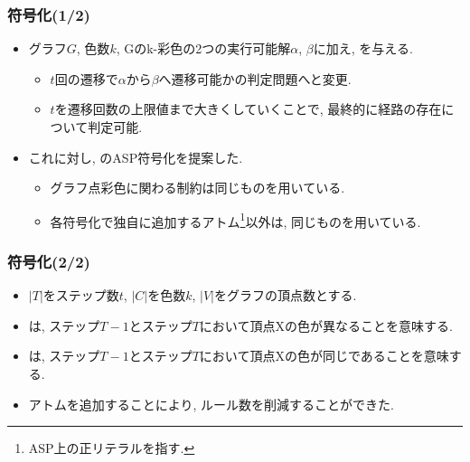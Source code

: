 \documentclass[dvipdfmx,11pt]{beamer}
\begin{document}

\begin{frame}\frametitle{符号化(1/2)}

  \begin{itemize}
    \item グラフ$G$, 色数$k$, Gのk-彩色の2つの実行可能解$\alpha$, $\beta$に加え, を与える.
    \begin{itemize}
      \item $t$回の遷移で$\alpha$から$\beta$へ遷移可能かの判定問題へと変更.
      \item $t$を遷移回数の上限値まで大きくしていくことで, 最終的に経路の存在について判定可能. 
    \end{itemize}
    \item これに対し, のASP符号化を提案した. 
    \begin{itemize}
      \item グラフ点彩色に関わる制約は同じものを用いている.
      \item 各符号化で独自に追加するアトム\footnote{ASP上の正リテラルを指す.}以外は, 同じものを用いている.
    \end{itemize}
  \end{itemize}


  
\end{frame}


\begin{frame}\frametitle{符号化(2/2)}

  \begin{itemize}
    \item $|T|$をステップ数$t$, $|C|$を色数$k$, $|V|$をグラフの頂点数とする.
    
  \end{itemize}

  \begin{table}[t]
    \centering
    
  \end{table}

  \begin{itemize}
    \item {}は, ステップ$T-1$とステップ$T$において頂点Xの色が異なることを意味する.
    \item {}は, ステップ$T-1$とステップ$T$において頂点Xの色が同じであることを意味する.
    \item アトムを追加することにより, ルール数を削減することができた.
  \end{itemize}
  
\end{frame}
\end{document}

